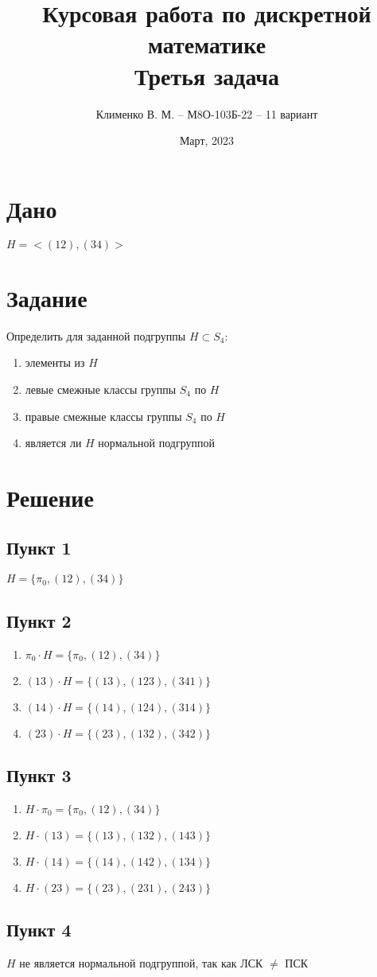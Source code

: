 \documentclass{article}
\title{Курсовая работа по дискретной математике\\Третья задача}
\author{Клименко В. М. -- М8О-103Б-22 -- 11 вариант}
\date{Март, 2023}
\begin{document}
\maketitle


\section*{Дано}
$H = <(12), (34)>$


\section*{Задание}
Определить для заданной подгруппы $H \subset S_4$:
\begin{enumerate}
    \item элементы из $H$
    \item левые смежные классы группы $S_4$ по $H$
    \item правые смежные классы группы $S_4$ по $H$
    \item является ли $H$ нормальной подгруппой
\end{enumerate}


\section*{Решение}
\subsection*{Пункт 1}
$H = \{\pi_0, (12),(34)\}$

\subsection*{Пункт 2}
\begin{enumerate}
    \item $\pi_0 \cdot H = \{\pi_0, (12) , (34)\}$
    \item $(13)  \cdot H = \{(13) , (123), (341)\}$
    \item $(14)  \cdot H = \{(14) , (124), (314)\}$
    \item $(23)  \cdot H = \{(23) , (132), (342)\}$
\end{enumerate}

\subsection*{Пункт 3}
\begin{enumerate}
    \item $H \cdot \pi_0 = \{\pi_0, (12) , (34)\}$
    \item $H \cdot (13)  = \{(13) , (132), (143)\}$
    \item $H \cdot (14)  = \{(14) , (142), (134)\}$
    \item $H \cdot (23)  = \{(23) , (231), (243)\}$
\end{enumerate}

\subsection*{Пункт 4}
$H$ не является нормальной подгруппой, так как ЛСК $\ne$ ПСК
\end{document}
